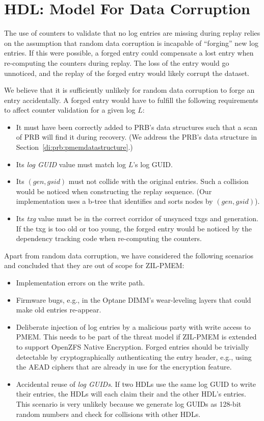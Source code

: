 \documentclass[12pt,a4paper,twoside]{book}
\begin{document}
{\section{HDL: Model For Data Corruption}\label{di:prb:modeldatacorruption}
The use of counters to validate that no log entries are missing during replay relies on the assumption that random data corruption is incapable of ``forging'' new log entries.
If this were possible, a forged entry could compensate a lost entry when re-computing the counters during replay.
The loss of the entry would go unnoticed, and the replay of the forged entry would likely corrupt the dataset.

We believe that it is sufficiently unlikely for random data corruption to forge an entry accidentally.
A forged entry would have to fulfill the following requirements to affect counter validation for a given log $L$:
\begin{itemize}[noitemsep]
    \item It must have been correctly added to PRB's data structures such that a scan of PRB will find it during recovery.
        (We address the PRB's data structure in Section~\ref{di:prb:pmemdatastructure}.)
    \item Its \textit{log GUID} value must match log $L$'s log GUID.
    \item Its $(gen, gsid)$ must not collide with the original entries.
        Such a collision would be noticed when constructing the replay sequence.
        (Our implementation uses a b-tree that identifies and sorts nodes by $(gen, gsid)$).
    \item Its \textit{txg} value must be in the correct corridor of unsynced txgs and generation.
        If the txg is too old or too young, the forged entry would be noticed by the dependency tracking code when re-computing the counters.
\end{itemize}

Apart from random data corruption, we have considered the following scenarios and concluded that they are out of scope for ZIL-PMEM:
\begin{itemize}[noitemsep]
\item Implementation errors on the write path.
\item Firmware bugs, e.g., in the Optane DIMM's wear-leveling layers that could make old entries re-appear.
\item Deliberate injection of log entries by a malicious party with write access to PMEM.
    This needs to be part of the threat model if ZIL-PMEM is extended to support OpenZFS Native Encryption.
    Forged entries should be trivially detectable by cryptographically authenticating the entry header, e.g., using the AEAD ciphers that are already in use for the encryption feature.
\item Accidental reuse of \textit{log GUIDs}.
    If two HDLs use the same log GUID to write their entries, the HDLs will each claim their and the other HDL's entries.
    This scenario is very unlikely because we generate log GUIDs as 128-bit random numbers and check for collisions with other HDLs.
\end{itemize}

}
\end{document}
